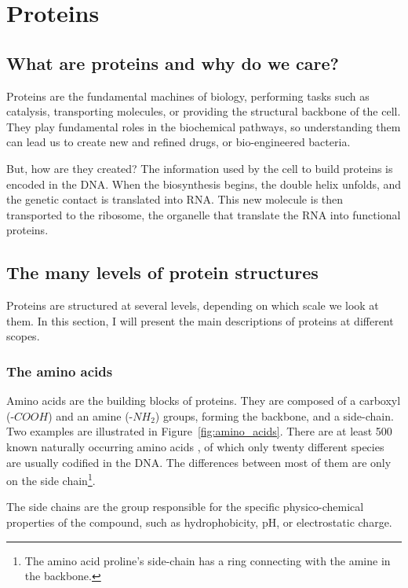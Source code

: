 \chapter{Proteins}
\section[What are proteins?]{What are proteins and why do we care?}
Proteins are the fundamental machines of biology, performing tasks such as catalysis, transporting molecules, or providing the structural backbone of the cell.
They play fundamental roles in the biochemical pathways, so understanding them can lead us to create new and refined drugs,
or bio-engineered bacteria.


But, how are they created?
The information 
used by the cell to build proteins is encoded in the DNA.
When the biosynthesis begins, the double helix unfolds, and the genetic contact is translated into RNA.
This new molecule is then transported to the ribosome, the organelle that translate the RNA into functional proteins.


\section{The many levels of protein structures}
Proteins are structured at several levels, depending on which scale we look at them.
In this section, I will present the main descriptions of proteins at different scopes.


\subsection{The amino acids}
Amino acids are the building blocks of proteins.
They are composed of a carboxyl (-$COOH$) and an amine (-$NH_2$) groups, forming the backbone, and a side-chain.
Two examples are illustrated in Figure~\ref{fig:amino_acids}.
There are at least 500 known naturally occurring amino acids \citep{500_amino_acids}, of which only twenty different species are usually codified in the DNA.
The differences between most of them are only on the side chain\footnote{The amino acid proline's side-chain has a ring connecting with the amine in the backbone.}.

The side chains are the group responsible for the specific physico-chemical properties of the compound, such as hydrophobicity, pH, or electrostatic charge.

